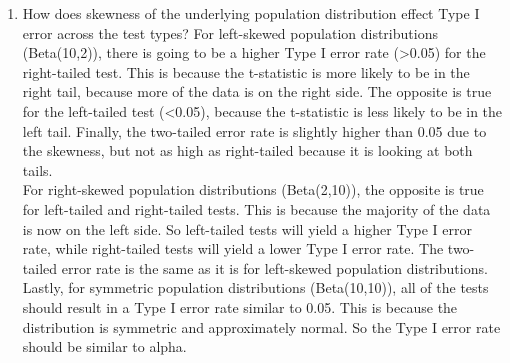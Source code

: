 \documentclass{article}\usepackage[]{graphicx}\usepackage[]{xcolor}
\begin{document}
\begin{enumerate}
\begin{enumerate}
    \item How does skewness of the underlying population distribution effect
    Type I error across the test types?
For left-skewed population distributions (Beta(10,2)), there is going to be a higher Type I error rate (\textgreater 0.05) for the right-tailed test. This is because the t-statistic is more likely to be in the right tail, because more of the data is on the right side. The opposite is true for the left-tailed test (\textless 0.05), because the t-statistic is less likely to be in the left tail. Finally, the two-tailed error rate is slightly higher than 0.05 due to the skewness, but not as high as right-tailed because it is looking at both tails.
\\
For right-skewed population distributions (Beta(2,10)), the opposite is true for left-tailed and right-tailed tests. This is because the majority of the data is now on the left side. So left-tailed tests will yield a higher Type I error rate, while right-tailed tests will yield a lower Type I error rate. The two-tailed error rate is the same as it is for left-skewed population distributions.
\\
Lastly, for symmetric population distributions (Beta(10,10)), all of the tests should result in a Type I error rate similar to 0.05. This is because the distribution is symmetric and approximately normal. So the Type I error rate should be similar to alpha.
  \end{enumerate}
\end{enumerate}

\end{document}
